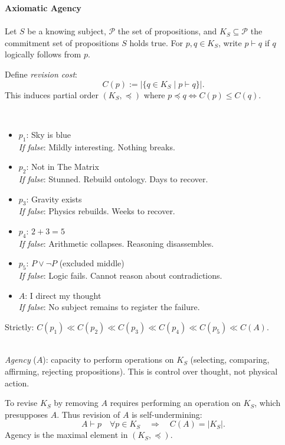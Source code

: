 \begin{technical}
{\Large\textbf{Axiomatic Agency}}\\[0.2em]

\\[0.1em]
Let $S$ be a knowing subject, $\mathcal{P}$ the set of propositions, and $K_S \subseteq \mathcal{P}$ the commitment set of propositions $S$ holds true. For $p, q \in K_S$, write $p \vdash q$ if $q$ logically follows from $p$.

Define \textit{revision cost}:
\[
C(p) := |\{q \in K_S \mid p \vdash q\}|.
\]
This induces partial order $(K_S, \preceq)$ where $p \preceq q \iff C(p) \leq C(q)$.

\\[0.1em]
\begin{itemize}[leftmargin=*,topsep=0pt,itemsep=1pt]
    \item $p_1$: \QSOpen{}Sky is blue\QSClose{}\\
    \textit{If false}: Mildly interesting. Nothing breaks.
    \item $p_2$: \QSOpen{}Not in The Matrix\QSClose{}\\
    \textit{If false}: Stunned. Rebuild ontology. Days to recover.
    \item $p_3$: \QSOpen{}Gravity exists\QSClose{}\\
    \textit{If false}: Physics rebuilds. Weeks to recover.
    \item $p_4$: \QSOpen{}$2+3=5$\QSClose{}\\
    \textit{If false}: Arithmetic collapses. Reasoning disassembles.
    \item $p_5$: \QSOpen{}$P \vee \neg P$\QSClose{} (excluded middle)\\
    \textit{If false}: Logic fails. Cannot reason about contradictions.
    \item $A$: \QSOpen{}I direct my thought\QSClose{}\\
    \textit{If false}: No subject remains to register the failure.
\end{itemize}
Strictly: $C(p_1) \ll C(p_2) \ll C(p_3) \ll C(p_4) \ll C(p_5) \ll C(A)$.

\\[0.1em]
\textit{Agency} ($A$): capacity to perform operations on $K_S$ (selecting, comparing, affirming, rejecting propositions). This is control over thought, not physical action.

To revise $K_S$ by removing $A$ requires performing an operation on $K_S$, which presupposes $A$. Thus revision of $A$ is self-undermining:
\[
A \vdash p \quad \forall p \in K_S \quad \Rightarrow \quad C(A) = |K_S|.
\]
Agency is the maximal element in $(K_S, \preceq)$.


\end{technical}
